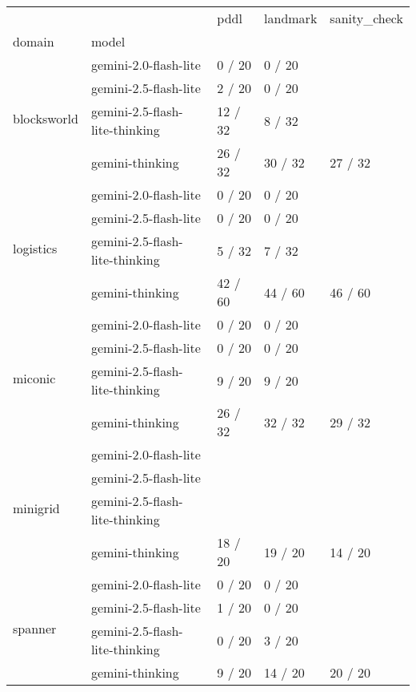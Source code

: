 \begin{tabular}{lllll}
\toprule
 &  & pddl & landmark & sanity\_check \\
domain & model &  &  &  \\
\midrule
\multirow[t]{4}{*}{blocksworld} & gemini-2.0-flash-lite & 0 / 20 & 0 / 20 &  \\
 & gemini-2.5-flash-lite & 2 / 20 & 0 / 20 &  \\
 & gemini-2.5-flash-lite-thinking & 12 / 32 & 8 / 32 &  \\
 & gemini-thinking & 26 / 32 & 30 / 32 & 27 / 32 \\
\cline{1-5}
\multirow[t]{4}{*}{logistics} & gemini-2.0-flash-lite & 0 / 20 & 0 / 20 &  \\
 & gemini-2.5-flash-lite & 0 / 20 & 0 / 20 &  \\
 & gemini-2.5-flash-lite-thinking & 5 / 32 & 7 / 32 &  \\
 & gemini-thinking & 42 / 60 & 44 / 60 & 46 / 60 \\
\cline{1-5}
\multirow[t]{4}{*}{miconic} & gemini-2.0-flash-lite & 0 / 20 & 0 / 20 &  \\
 & gemini-2.5-flash-lite & 0 / 20 & 0 / 20 &  \\
 & gemini-2.5-flash-lite-thinking & 9 / 20 & 9 / 20 &  \\
 & gemini-thinking & 26 / 32 & 32 / 32 & 29 / 32 \\
\cline{1-5}
\multirow[t]{4}{*}{minigrid} & gemini-2.0-flash-lite &  &  &  \\
 & gemini-2.5-flash-lite &  &  &  \\
 & gemini-2.5-flash-lite-thinking &  &  &  \\
 & gemini-thinking & 18 / 20 & 19 / 20 & 14 / 20 \\
\cline{1-5}
\multirow[t]{4}{*}{spanner} & gemini-2.0-flash-lite & 0 / 20 & 0 / 20 &  \\
 & gemini-2.5-flash-lite & 1 / 20 & 0 / 20 &  \\
 & gemini-2.5-flash-lite-thinking & 0 / 20 & 3 / 20 &  \\
 & gemini-thinking & 9 / 20 & 14 / 20 & 20 / 20 \\
\cline{1-5}
\end{tabular}